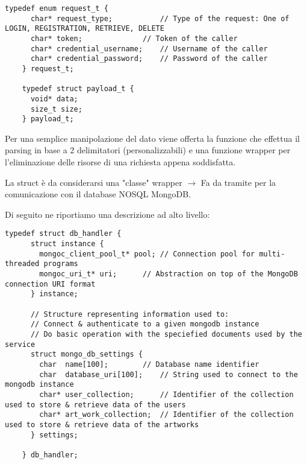   \begin{lstlisting}[language={[POSIX]C}, style=wnumbers]
    typedef enum request_t {
      char* request_type;	        // Type of the request: One of LOGIN, REGISTRATION, RETRIEVE, DELETE
      char* token;		        // Token of the caller
      char* credential_username;	// Username of the caller
      char* credential_password;	// Password of the caller
    } request_t;

    typedef struct payload_t {
      void* data;
      size_t size;
    } payload_t;
  \end{lstlisting}

  Per una semplice manipolazione del dato viene offerta la funzione  che effettua il parsing in base a 2 delimitatori (personalizzabili) e una funzione wrapper  per l'eliminazione delle risorse di una richiesta appena soddisfatta.

  \begin{center}  \end{center}

  La struct  è da considerarsi una "classe" wrapper \footnotemark {} $\rightarrow$ Fa da tramite per la comunicazione con il database NOSQL MongoDB.

  Di seguito ne riportiamo una descrizione ad alto livello:

  \begin{lstlisting}[language={[POSIX]C}, style=wnumbers]
    typedef struct db_handler {
      struct instance {
        mongoc_client_pool_t* pool;	// Connection pool for multi-threaded programs
        mongoc_uri_t* uri;		// Abstraction on top of the MongoDB connection URI format
      } instance;

      // Structure representing information used to:
      // Connect & authenticate to a given mongodb instance
      // Do basic operation with the speciefied documents used by the service
      struct mongo_db_settings {
        char  name[100];		// Database name identifier
        char  database_uri[100];	// String used to connect to the mongodb instance
        char* user_collection;		// Identifier of the collection used to store & retrieve data of the users
        char* art_work_collection;	// Identifier of the collection used to store & retrieve data of the artworks
      } settings;

    } db_handler;
  \end{lstlisting}

